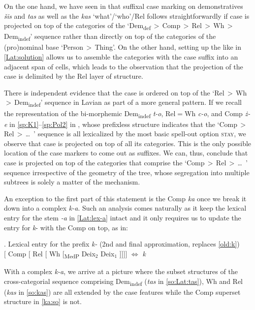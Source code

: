 On the one hand, we have seen in  that suffixal case marking on demonstratives \textit{\v{s}is} and \textit{tas} as well as the  \textit{kas} `what'/`who'/Rel follows straightforwardly if case is projected on top of the categories of the `Dem\textsubscript{def}\,$>$\,Comp\,$>$\,Rel\,$>$\,Wh\,$>$ Dem\textsubscript{indef}' sequence rather than directly on top of the categories of the (pro)no\-mi\-nal base `Person\,$>$\,Thing'.
On the other hand, setting up the  like in \ref{Lat:solution} allows us to assemble the categories with the case suffix into an adjacent span of cells, which leads to the observation that the projection of the case is delimited by the Rel layer of structure. 
\par
There is independent evidence that the case  is ordered on top of the `Rel\,$>$\,Wh\,$>$\,Dem\textsubscript{indef}' sequence in Lavian as part of a more general pattern. 
If we recall the representation of the  bi-morphemic Dem\textsubscript{indef} \textit{t-o}, Rel$=$Wh \textit{c-o}, and Comp \textit{\.z-e} in \ref{sp:K1}--\ref{sp:Pol2} in , whose prefixless structure indicates that the `Comp\,$>$\,Rel\,$>$\,\ldots \ ' sequence is all lexicalized by the most basic spell-out option \textsc{stay}, we observe that case is projected on top of all its categories. This is the only possible location of the case markers to come out as suffixes. 
We can, thus, conclude that case is projected on top of the categories that comprise the `Comp\,$>$\,Rel\,$>$\,\ldots \ ' sequence irrespective of the geometry of the tree, whose segregation into multiple subtrees is solely a matter of the  mechanism. 
\par
An exception to the first part of this statement is the  Comp \textit{ka} once we break it down into a complex \textit{k-a}. Such an analysis comes naturally as it keep the lexical entry for the stem \textit{-a} in \ref{Lat:lex-a} intact and it only requires us to update the entry for \textit{k}- with the Comp  on top, as in:

\ex. Lexical entry for the  prefix \textit{k-} (2nd and final approximation, replaces \ref{old:k})\label{Lat:lex:k}\\[0.5ex]
[ Comp [ Rel [ Wh [\textsubscript{MedP} Deix$_{2}$ Deix$_{1}$ ]]]] $\Leftrightarrow$ \textit{k}

With a complex \textit{k-a}, we arrive at a picture where the subset structures of the cross-categorial sequence comprising Dem\textsubscript{indef} (\textit{tas} in \ref{so:Lat:tas}), Wh and Rel (\textit{kas} in \ref{so:kas}) are all extended by the case features while the Comp superset structure in \ref{ka:so} is not. 

